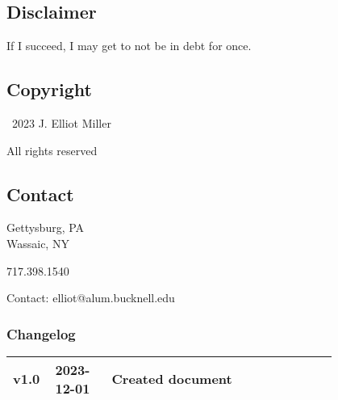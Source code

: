 \documentclass[
	letterpaper, %
	12pt, %
]{CSSullivanBusinessReport}
\begin{document}
\begin{twothirdswidth} %
	\footnotesize %
	
	\subsection*{Disclaimer}

	If I succeed, I may get to not be in debt for once.
	
	\subsection*{Copyright}
	
	\textcopyright~2023 J. Elliot Miller 
	
	All rights reserved
	
	\subsection*{Contact}
	
	Gettysburg, PA\\
	Wassaic, NY
	
	717.398.1540
	
	Contact: elliot@alum.bucknell.edu
	
	\vfill %
	
	\subsubsection*{Changelog}
	
	\scriptsize %
	
	\begin{tabular}{@{} L{0.05\linewidth} L{0.15\linewidth} L{0.6\linewidth} @{}} %
		\toprule
		v1.0 & 2023-12-01 & Created document\\
		\bottomrule
	\end{tabular}
\end{twothirdswidth}

\newpage


\begin{twothirdswidth} %
	\tableofcontents %
\end{twothirdswidth}
\end{document}
